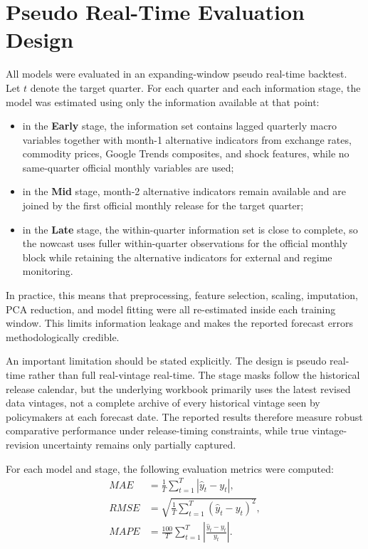\documentclass[12pt,a4paper]{report}
\begin{document}
\section{Pseudo Real-Time Evaluation Design}

All models were evaluated in an expanding-window pseudo real-time backtest. Let $t$ denote the target quarter. For each quarter and each information stage, the model was estimated using only the information available at that point:
\begin{itemize}
    \item in the \textbf{Early} stage, the information set contains lagged quarterly macro variables together with month-1 alternative indicators from exchange rates, commodity prices, Google Trends composites, and shock features, while no same-quarter official monthly variables are used;
    \item in the \textbf{Mid} stage, month-2 alternative indicators remain available and are joined by the first official monthly release for the target quarter;
    \item in the \textbf{Late} stage, the within-quarter information set is close to complete, so the nowcast uses fuller within-quarter observations for the official monthly block while retaining the alternative indicators for external and regime monitoring.
\end{itemize}

In practice, this means that preprocessing, feature selection, scaling, imputation, PCA reduction, and model fitting were all re-estimated inside each training window. This limits information leakage and makes the reported forecast errors methodologically credible.

An important limitation should be stated explicitly. The design is pseudo real-time rather than full real-vintage real-time. The stage masks follow the historical release calendar, but the underlying workbook primarily uses the latest revised data vintages, not a complete archive of every historical vintage seen by policymakers at each forecast date. The reported results therefore measure robust comparative performance under release-timing constraints, while true vintage-revision uncertainty remains only partially captured.

For each model and stage, the following evaluation metrics were computed:
\begin{align}
    MAE &= \frac{1}{T}\sum_{t=1}^T |\hat{y}_t - y_t|, \\
    RMSE &= \sqrt{\frac{1}{T}\sum_{t=1}^T (\hat{y}_t - y_t)^2}, \\
    MAPE &= \frac{100}{T}\sum_{t=1}^T \left| \frac{\hat{y}_t - y_t}{y_t} \right|.
\end{align}
\end{document}
